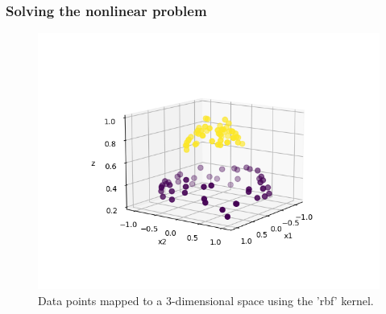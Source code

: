 \documentclass{beamer}
\begin{document}
\begin{frame}{}
	\frametitle{Solving the nonlinear problem}
	\begin{figure}[h]
		\includegraphics[scale=0.5]{img/Circle3D.png}
		\caption{Data points mapped to a 3-dimensional space using the 'rbf' kernel.}
		\label{Fig:rbf3d}
	\end{figure}
\end{frame}
\end{document}

